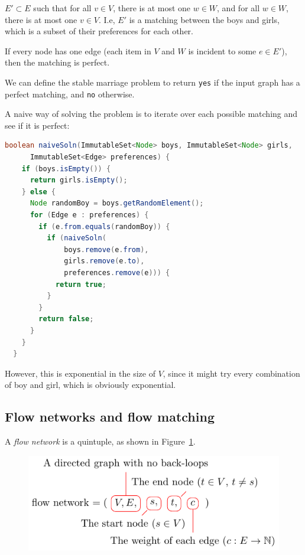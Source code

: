 $E' \subset E$ such that for all $v \in V$, there is at most one $w \in W$, and
for all $w \in W$, there is at most one $v \in V$. I.e, $E'$ is a matching
between the boys and girls, which is a subset of their preferences for each
other.

If every node has one edge (each item in $V$ and $W$ is incident to some $e \in
E'$), then the matching is perfect.

We can define the stable marriage problem to return \texttt{yes} if the input
graph has a perfect matching, and \texttt{no} otherwise.

A naive way of solving the problem is to iterate over each possible matching and
see if it is perfect:

\begin{lstlisting}[language=Java]
  boolean naiveSoln(ImmutableSet<Node> boys, ImmutableSet<Node> girls,
      ImmutableSet<Edge> preferences) {
    if (boys.isEmpty()) {
      return girls.isEmpty();
    } else {
      Node randomBoy = boys.getRandomElement();
      for (Edge e : preferences) {
        if (e.from.equals(randomBoy)) {
          if (naiveSoln(
              boys.remove(e.from),
              girls.remove(e.to),
              preferences.remove(e))) {
            return true;
          }
        }
        return false;
      }
    }
  }
\end{lstlisting}

However, this is exponential in the size of $V$, since it might try every
combination of boy and girl, which is obviously exponential.

\subsection{Flow networks and flow matching}

A \textit{flow network} is a quintuple, as shown in
Figure~\ref{fig:flow-network-definition}.

\begin{figure}[H]
  \centering
  \includegraphics{equations/flow-network}
  \caption{}
  \label{fig:flow-network-definition}
\end{figure}

